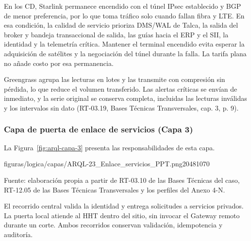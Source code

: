 En los CD, Starlink permanece encendido con el túnel IPsec establecido y BGP de menor preferencia, por lo que toma tráfico solo cuando fallan fibra y LTE. En esa condición, la calidad de servicio prioriza DMS/WAL de Talca, la salida del broker y bandeja transaccional de salida, las guías hacia el ERP y el SII, la identidad y la telemetría crítica. Mantener el terminal encendido evita esperar la adquisición de satélites y la negociación del túnel durante la falla. La tarifa plana no añade costo por esa permanencia.

\enlargethispage{2\baselineskip}
Greengrass agrupa las lecturas en lotes y las transmite con compresión sin pérdida, lo que reduce el volumen transferido. Las alertas críticas se envían de inmediato, y la serie original se conserva completa, incluidas las lecturas inválidas y los intervalos sin dato (RT-03.19, Bases Técnicas Transversales, cap. 3, p. 9).

\begin{landscape}
\subsubsection{Capa de puerta de enlace de servicios (Capa 3)}

La Figura~\ref{fig:arql-capa-3} presenta las responsabilidades de esta capa.

\begin{center}
  \begin{minipage}{\linewidth}\centering
    {figuras/logica/capas/ARQL-23_Enlace_servicios_PPT.png}{2048}{1070}{}
  \label{fig:arql-capa-3}
  \par\smallskip
  {\raggedright\fontsize{9pt}{11pt}\selectfont\raggedright Fuente: elaboración propia a partir de RT-03.10 de las Bases Técnicas del caso, RT-12.05 de las Bases Técnicas Transversales y los perfiles del Anexo 4-N.\par}
  \end{minipage}
\end{center}
\end{landscape}

El recorrido central valida la identidad y entrega solicitudes a servicios privados. La puerta local atiende al HHT dentro del sitio, sin invocar el Gateway remoto durante un corte. Ambos recorridos conservan validación, idempotencia y auditoría.


